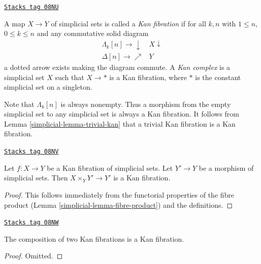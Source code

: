 \begin{definition}[Kan]
\label{simplicial-definition-kan}
\href{https://stacks.math.columbia.edu/tag/08NU}{\texttt{Stacks tag 08NU}}

A map $X \to Y$ of simplicial sets is called a {\it Kan fibration}
if for all $k, n$ with $1 \leq n$, $0 \leq k \leq n$ and any commutative
solid diagram
$$
\begin{array}{cc}\Lambda_k[n] \longrightarrow\downarrow & X \downarrow \\ \Delta[n] \longrightarrow\nearrow & Y\end{array}
$$
a dotted arrow exists making the diagram commute. A {\it Kan complex}
is a simplicial set $X$ such that $X \to *$ is a Kan fibration, where
$*$ is the constant simplicial set on a singleton.
\end{definition}

Note that $\Lambda_k[n]$ is always nonempty. Thus a morphism from the empty
simplicial set to any simplicial set is always a Kan fibration. It follows
from Lemma \ref{simplicial-lemma-trivial-kan} that a trivial Kan fibration is a
Kan fibration.

\begin{lemma}
\label{simplicial-lemma-kan-base-change}
\href{https://stacks.math.columbia.edu/tag/08NV}{\texttt{Stacks tag 08NV}}

Let $f : X \to Y$ be a Kan fibration of simplicial sets.
Let $Y' \to Y$ be a morphism of simplicial sets.
Then $X \times_Y Y' \to Y'$ is a Kan fibration.
\end{lemma}

\begin{proof}

This follows immediately from the functorial properties of the fibre
product (Lemma \ref{simplicial-lemma-fibre-product}) and the definitions.
\end{proof}

\begin{lemma}
\label{simplicial-lemma-kan-composition}
\href{https://stacks.math.columbia.edu/tag/08NW}{\texttt{Stacks tag 08NW}}

The composition of two Kan fibrations is a Kan fibration.
\end{lemma}

\begin{proof}
Omitted.
\end{proof}

